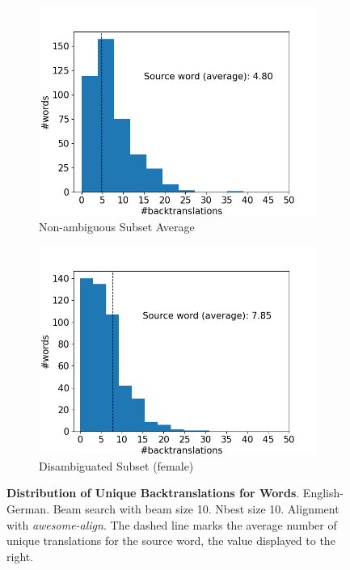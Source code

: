 \begin{figure}[!htb]
\begin{subfigure}{0.49\textwidth}
         \label{fig:alignment_backtranslation_male}
     \end{subfigure}
     \begin{subfigure}{0.49\textwidth}
         \centering
         \includegraphics[width=\textwidth]{figures/alignment/word_backtranslations_average.png}
         \caption{Non-ambiguous Subset Average}
         \label{fig:alignment_backtranslation_common}
     \end{subfigure}
     \hfill
     \begin{subfigure}{0.49\textwidth}
         \centering
         \includegraphics[width=\textwidth]{figures/alignment/word_backtranslations_female.png}
         \caption{Disambiguated Subset (female)}
         \label{fig:alignment_backtranslation_female}
     \end{subfigure}
        \caption{\textbf{Distribution of Unique Backtranslations for Words}. English-German. Beam search with beam size 10. Nbest size 10. Alignment with \textit{awesome-align}. The dashed line marks the average number of unique translations for the source word, the value displayed to the right.}
        \label{fig:alignment_graphs_backtranslation_10}

\end{figure}